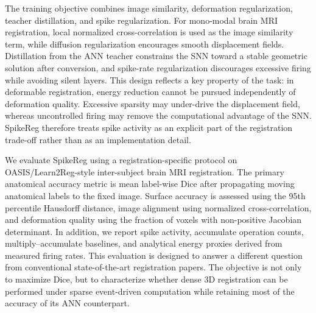 The training objective combines image similarity, deformation regularization, teacher distillation, and spike regularization. For mono-modal brain MRI registration, local normalized cross-correlation is used as the image similarity term, while diffusion regularization encourages smooth displacement fields. Distillation from the ANN teacher constrains the SNN toward a stable geometric solution after conversion, and spike-rate regularization discourages excessive firing while avoiding silent layers. This design reflects a key property of the task: in deformable registration, energy reduction cannot be pursued independently of deformation quality. Excessive sparsity may under-drive the displacement field, whereas uncontrolled firing may remove the computational advantage of the SNN. SpikeReg therefore treats spike activity as an explicit part of the registration trade-off rather than as an implementation detail.


We evaluate SpikeReg using a registration-specific protocol on OASIS/Learn2Reg-style inter-subject brain MRI registration. The primary anatomical accuracy metric is mean label-wise Dice after propagating moving anatomical labels to the fixed image. Surface accuracy is assessed using the 95th percentile Hausdorff distance, image alignment using normalized cross-correlation, and deformation quality using the fraction of voxels with non-positive Jacobian determinant. In addition, we report spike activity, accumulate operation counts, multiply--accumulate baselines, and analytical energy proxies derived from measured firing rates. This evaluation is designed to answer a different question from conventional state-of-the-art registration papers. The objective is not only to maximize Dice, but to characterize whether dense 3D registration can be performed under sparse event-driven computation while retaining most of the accuracy of its ANN counterpart.


